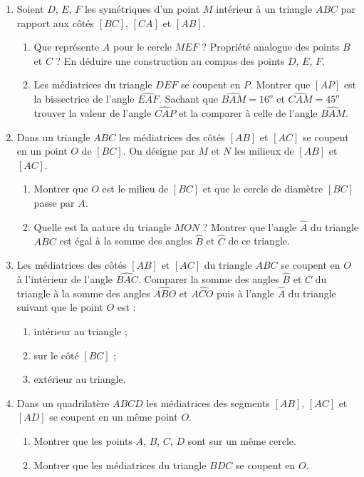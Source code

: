\begin{enumerate}
\begin{enumerate}
\end{enumerate}
\item Soient $D$, $E$, $F$ les symétriques d'un point $M$ intérieur à un triangle $ABC$ par rapport aux côtés $[BC]$, $[CA]$ et $[AB]$.\begin{enumerate}
\item Que représente $A$ pour le cercle $MEF$ ? Propriété analogue des points $B$
et $C$ ? En déduire une construction au compas des points $D$, $E$, $F$. 
\item Les médiatrices du triangle $DEF$ se coupent en $P$. Montrer que $[AP]$ est
la bissectrice de l'angle $\widehat{EAF}$. Sachant que $\widehat{BAM}=16^o$ et $\widehat{CAM}=45^o$ trouver la valeur de l'angle $\widehat{CAP}$ et la comparer à celle de l'angle $\widehat{BAM}$. 
\end{enumerate}
\item Dans un triangle $ABC$ les médiatrices des côtés $[AB]$ et $[AC]$ se coupent
en un point $O$ de $[BC]$. On désigne par $M$ et $N$ les milieux de $[AB]$ et $[AC]$.
\begin{enumerate}
\item Montrer que $O$ est le milieu de $[BC]$ et que le cercle de diamètre $[BC]$ passe par $A$. 
\item Quelle est la nature du triangle $MON$ ? Montrer que l'angle $\widehat{A}$ du 
triangle $ABC$ est égal à la somme des angles $\widehat{B}$ et $\widehat{C}$ de ce triangle.
\end{enumerate}
\item Les médiatrices des côtés $[AB]$ et $[AC]$ du triangle $ABC$ se coupent en $O$
à l'intérieur de l'angle $\widehat{BAC}$. Comparer la somme des angles $\widehat{B}$
et $\widehat{C}$ du triangle à la somme des angles $\widehat{ABO}$ et $\widehat{ACO}$
puis à l'angle $\widehat{A}$ du triangle suivant que le point $O$ est : \begin{enumerate}
\item intérieur au triangle ; \item sur le côté $[BC]$ ; \item extérieur au triangle.
\end{enumerate}
\item Dans un quadrilatère $ABCD$ les médiatrices des segments $[AB]$, $[AC]$ et 
$[AD]$ se coupent en un même point $O$. \begin{enumerate}
\item Montrer que les points $A$, $B$, $C$, $D$ sont sur un même cercle. 
\item Montrer que les médiatrices du triangle $BDC$ se coupent en $O$.

\end{enumerate}
\end{enumerate}
